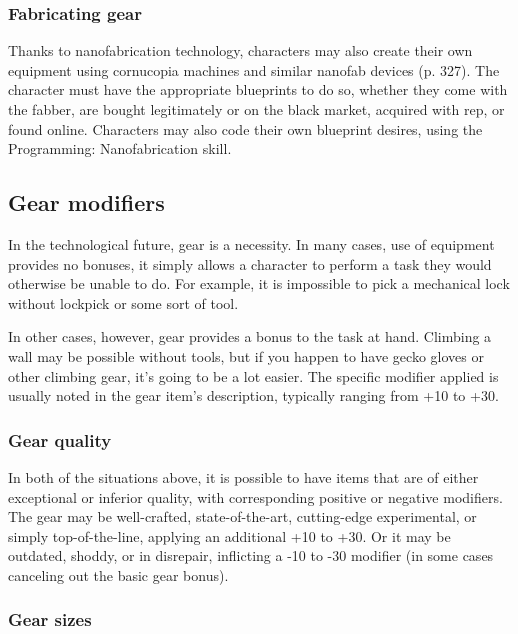 \subsubsection{Fabricating gear} 

Thanks to nanofabrication technology, characters may also create their own equipment using cornucopia machines and similar nanofab devices (p. 327). The character must have the appropriate blueprints to do so, whether they come with the fabber, are bought legitimately or on the black market, acquired with rep, or found online. Characters may also code their own blueprint desires, using the Programming: Nanofabrication skill. 



\subsection{Gear modifiers} \label{sec:gear-modifiers} 

In the technological future, gear is a necessity. In many cases, use of equipment provides no bonuses, it simply allows a character to perform a task they would otherwise be unable to do. For example, it is impossible to pick a mechanical lock without lockpick or some sort of tool. 

In other cases, however, gear provides a bonus to the task at hand. Climbing a wall may be possible without tools, but if you happen to have gecko gloves or other climbing gear, it’s going to be a lot easier. The specific modifier applied is usually noted in the gear item’s description, typically ranging from +10 to +30. 

\subsubsection{Gear quality} 

In both of the situations above, it is possible to have items that are of either exceptional or inferior quality, with corresponding positive or negative modifiers. The gear may be well-crafted, state-of-the-art, cutting-edge experimental, or simply top-of-the-line, applying an additional +10 to +30. Or it may be outdated, shoddy, or in disrepair, inflicting a -10 to -30 modifier (in some cases canceling out the basic gear bonus). 

\subsubsection{Gear sizes} 

